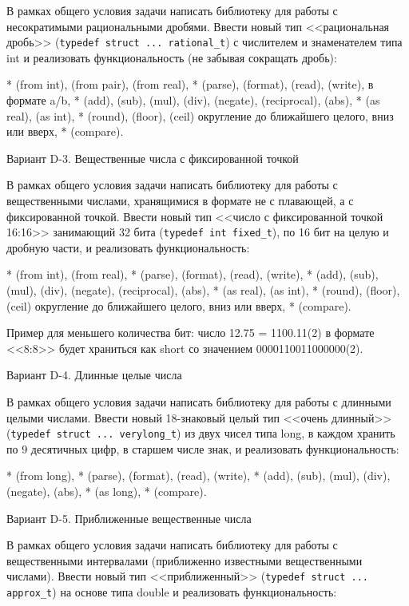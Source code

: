 В рамках общего условия задачи написать библиотеку для работы с несократимыми
рациональными дробями. Ввести новый тип <<рациональная дробь>> 
(\verb|typedef struct ... rational_t|) с числителем и знаменателем типа int и реализовать
функциональность (не забывая сокращать дробь):

* (from int), (from pair), (from real),
* (parse), (format), (read), (write), в формате a/b,
* (add), (sub), (mul), (div), (negate), (reciprocal), (abs),
* (as real), (as int),
* (round), (floor), (ceil) округление до ближайшего целого, вниз или вверх,
* (compare).


Вариант D-3. Вещественные числа с фиксированной точкой

В рамках общего условия задачи написать библиотеку для работы с вещественными
числами, хранящимися в формате не с плавающей, а с фиксированной точкой.
Ввести новый тип <<число с фиксированной точкой 16:16>> занимающий 32 бита
(\verb|typedef int fixed_t|), по 16 бит на целую и дробную части, и реализовать
функциональность:

* (from int), (from real),
* (parse), (format), (read), (write),
* (add), (sub), (mul), (div), (negate), (reciprocal), (abs),
* (as real), (as int),
* (round), (floor), (ceil) округление до ближайшего целого, вниз или вверх,
* (compare).

Пример для меньшего количества бит: число 12.75 = 1100.11(2) в формате <<8:8>>
будет храниться как short со значением 0000110011000000(2).


Вариант D-4. Длинные целые числа

В рамках общего условия задачи написать библиотеку для работы с длинными
целыми числами. Ввести новый 18-знаковый целый тип <<очень длинный>>
(\verb|typedef struct ... verylong_t|) из двух чисел типа long, в каждом хранить по 9 десятичных
цифр, в старшем числе знак, и реализовать функциональность:

* (from long),
* (parse), (format), (read), (write),
* (add), (sub), (mul), (div), (negate), (abs),
* (as long),
* (compare).


Вариант D-5. Приближенные вещественные числа

В рамках общего условия задачи написать библиотеку для работы с вещественными
интервалами (приближенно известными вещественными числами). Ввести новый тип
<<приближенный>> (\verb|typedef struct ... approx_t|) на основе типа double и реализовать
функциональность:

